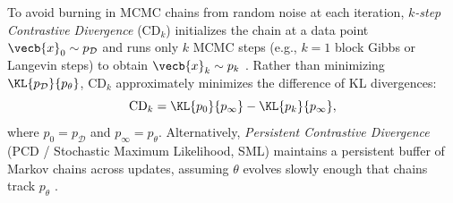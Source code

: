 \documentclass[../../../../master.tex]{subfiles}
\begin{document}
To avoid burning in MCMC chains from random noise at each iteration, \emph{$k$-step Contrastive Divergence} ($\mathrm{CD}_k$) initializes the chain at a data point $\vecb{x}_0 \sim p_{\mathcal{D}}$ and runs only $k$ MCMC steps (e.g., $k=1$ block Gibbs or Langevin steps) to obtain $\vecb{x}_k \sim p_k$ . Rather than minimizing $\KL{p_{\mathcal{D}}}{p_\theta}$, $\mathrm{CD}_k$ approximately minimizes the difference of KL divergences:
\begin{equation}
  \mathrm{CD}_k = \KL{p_0}{p_\infty} - \KL{p_k}{p_\infty},
  \label{eq:ebm:cd_obj}
\end{equation}
where $p_0 = p_{\mathcal{D}}$ and $p_\infty = p_\theta$. Alternatively, \emph{Persistent Contrastive Divergence} (PCD / Stochastic Maximum Likelihood, SML) maintains a persistent buffer of Markov chains across updates, assuming $\theta$ evolves slowly enough that chains track $p_\theta$ .
\end{document}
